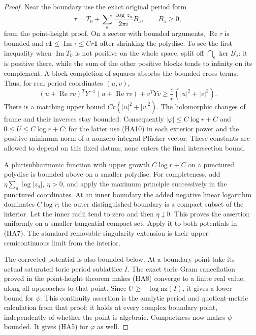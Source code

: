 \begin{proof}
Near the boundary use the exact original period form
\[
 \tau=T_0+\sum_a\frac{\log z_a}{2\pi i}B_a,
                    \qquad B_a\ge0,
 \tag{HA9}
\]
from the point-height proof.  On a sector with bounded arguments,
$\operatorname{Re}\tau$ is bounded and
$c\mathbf1\le\operatorname{Im}\tau\le Cr\mathbf1$ after
shrinking the polydisc.  To see the first inequality when
$\operatorname{Im}T_0$ is not positive on the whole space, split
off $\bigcap_a\ker B_a$: it is positive there, while the sum of
the other positive blocks tends to infinity on its complement.
A block completion of squares absorbs the bounded cross terms.
Thus, for real period coordinates $(u,v)$,
\[
 (u+\operatorname{Re}\tau v)^TY^{-1}
       (u+\operatorname{Re}\tau v)+v^TYv
                  \ge\frac c r(|u|^2+|v|^2).
 \tag{HA10}
\]
There is a matching upper bound $Cr(|u|^2+|v|^2)$.
The holomorphic changes of frame and their inverses stay bounded.
Consequently $|\varphi|\le C\log r+C$ and
$0\le U\le C\log r+C$: for the latter use (HA10) in each
exterior power and the positive minimum norm of a nonzero integral
Pl\"ucker vector.  These constants are allowed to depend on this
fixed datum; none enters the final intersection bound.

A plurisubharmonic function with upper growth $C\log r+C$ on a
punctured polydisc is bounded above on a smaller polydisc.  For
completeness, add $\eta\sum_a\log|z_a|$, $\eta>0$, and apply
the maximum principle successively in the punctured coordinates.
At an inner boundary the added negative linear logarithm dominates
$C\log r$; the outer distinguished boundary is a compact subset
of the interior.  Let the inner radii tend to zero and then
$\eta\downarrow0$.  This proves the assertion uniformly on a
smaller tangential compact set.  Apply it to both potentials in
(HA7).  The standard removable-singularity extension is their
upper-semicontinuous limit from the interior.

The corrected potential is also bounded below.  At a boundary
point take its actual saturated toric period sublattice $I$.
The exact toric Gram cancellation proved in the point-height
theorem makes (HA8) converge to a finite real value, along all
approaches to that point.  Since $U\ge-\log\mathrm{nz}(I)$,
it gives a lower bound for $\psi$.  This continuity assertion is
the analytic period and quotient-metric calculation from that
proof; it holds at every complex boundary point, independently
of whether the point is algebraic.  Compactness now makes $\psi$
bounded.  It gives (HA5) for $\varphi$ as well.


\end{proof}
